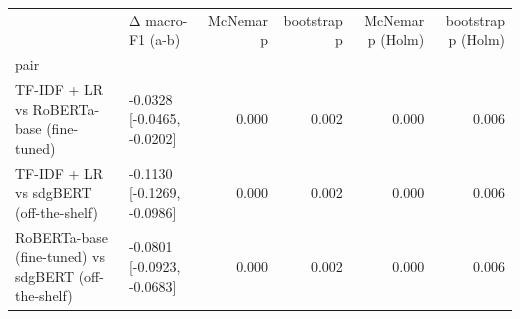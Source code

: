 \begin{tabular}{llrrrr}
\toprule
 & Δ macro-F1 (a-b) & McNemar p & bootstrap p & McNemar p (Holm) & bootstrap p (Holm) \\
pair &  &  &  &  &  \\
\midrule
TF-IDF + LR  vs  RoBERTa-base (fine-tuned) & -0.0328 [-0.0465, -0.0202] & 0.000 & 0.002 & 0.000 & 0.006 \\
TF-IDF + LR  vs  sdgBERT (off-the-shelf) & -0.1130 [-0.1269, -0.0986] & 0.000 & 0.002 & 0.000 & 0.006 \\
RoBERTa-base (fine-tuned)  vs  sdgBERT (off-the-shelf) & -0.0801 [-0.0923, -0.0683] & 0.000 & 0.002 & 0.000 & 0.006 \\
\bottomrule
\end{tabular}

